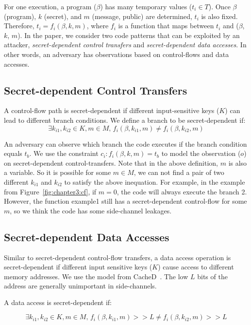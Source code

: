 For one execution, a program ($\beta$) has many temporary values ($t_i \in
T$). Once $\beta$ (program), $k$ (secret), and $m$ (message, public) are
determined, $t_i$ is also fixed. Therefore, $ t_i = f_i(\beta, k, m)$, where $f_
i$ is a function that maps between $t_i$ and ($\beta$, $k$, $m$). In the paper, 
we consider two code patterns that can be exploited by an attacker,
\emph{secret-dependent control transfers} and \emph{secret-dependent data
accesses}. In other words, an adversary has observations based on control-flows
and data accesses.

\subsection{Secret-dependent Control Transfers}
A control-flow path is secret-dependent if different input-sensitive keys
($K$) can lead to different branch conditions. 
We define a branch to be secret-dependent if:
$$\exists k_{i1}, k_{i2} \in K, m \in M, \,f_i(\beta, k_{i1}, m) \neq f_i(\beta, k_{i2}, m)$$

An adversary can observe which branch the code executes if the branch condition
equals $t_b$. We use the constraint $c_i : f_i(\beta, k, m) = t_b$ to model
the observation ($o$) on secret-dependent control-transfers. Note that in the
above definition, $m$ is also a variable. So it is possible for some $m \in M$,
we can not find a pair of two different $k_{i1}$ and $k_{i2}$ to satisfy the above
inequation. For example, in the example from Figure~\ref{fig:chapter3:cf}, if $m = 0$,
the code will always execute the branch 2. However, the function \textsf{example1} still
has a secret-dependent control-flow for some $m$, so we think the code has
some side-channel leakages.


\subsection{Secret-dependent Data Accesses}
Similar to secret-dependent control-flow transfers, a data access operation is
secret-dependent if different input sensitive keys ($K$) cause access to different
memory addresses. We use the model from CacheD~\cite{203878}. The low $L$ bits
of the address are generally unimportant in side-channels.

A data access is secret-dependent if:

$$\exists k_{i1}, k_{i2} \in K, m \in M,\,f_i(\beta, k_{i1}, m) >> L \neq f_i(\beta, k_{i2}, m) >> L$$

